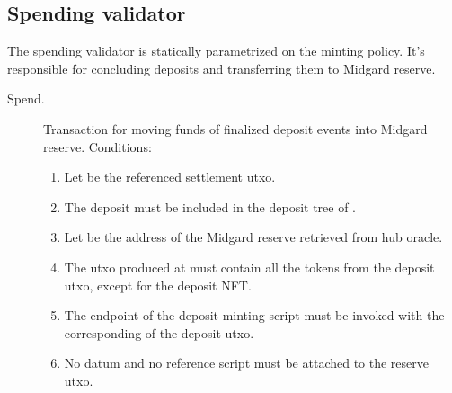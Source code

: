 \documentclass[../midgard.tex]{subfiles}
\begin{document}
\subsection{Spending validator}
\label{h:deposit-spending-validator}

The  spending validator is statically parametrized on the  minting policy.
It's responsible for concluding deposits and transferring them to Midgard reserve.

\begin{description}
  \item[Spend.] Transaction for moving funds of finalized deposit events into Midgard reserve.
    Conditions:
    \begin{enumerate}
      \item Let  be the referenced settlement utxo.
      \item The deposit must be included in the deposit tree of .
      \item Let  be the address of the Midgard reserve retrieved from hub oracle.
      \item The utxo produced at  must contain all the tokens from the deposit utxo, except for the deposit NFT.
      \item The  endpoint of the deposit minting script must be invoked with the corresponding  of the deposit utxo.
      \item No datum and no reference script must be attached to the reserve utxo.
    \end{enumerate}
\end{description}
\end{document}
